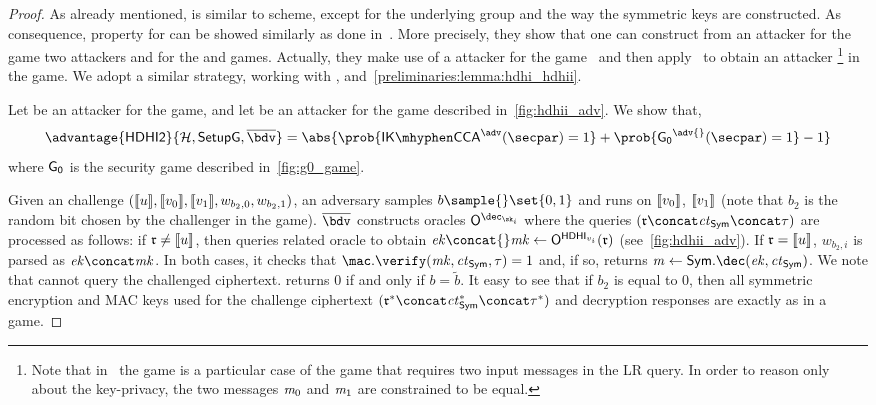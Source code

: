\begin{proof}
    As already mentioned, \dhaes{} is similar to \dhies{} scheme, except for the underlying group and the way the symmetric keys are constructed. As consequence, \ikcca{} property for \dhaes{} can be showed similarly as done in~\cite[Theorem 6.2]{abdalla2010robust}. More precisely, they show that one can construct from an attacker \adv{} for the \ikcca{} game two attackers \bdv{} and \cdv{} for the \odh{} and \sufcma{} games. Actually, they make use of a \bdvii{} attacker for the \odhii{} game~\cite[Figure 20]{abdalla2010robust} and then apply~\cite[Lemma 6.1]{abdalla2010robust} to obtain an attacker \bdv{}\footnote{Note that in~\cite{abdalla2010robust} the \ikcca{} game is a particular case of the \aicca{} game that requires two input messages in the LR query. In order to reason only about the key-privacy, the two messages $\mathit{m}_0$ and $\mathit{m}_1$ are constrained to be equal.} in the \odh{} game. We adopt a similar strategy, working with \hdhi{}, \hdhii{} and~\cref{preliminaries:lemma:hdhi_hdhii}.

    Let \adv{} be an attacker for the \ikcca{} game, and let \bdvii{} be an attacker for the \hdhii{} game described in~\cref{fig:hdhii_adv}. We show that,
    \[
        \advantage{\hdhii}{\hashSet, \groupSetup, \bdvii{}} = \abs{\prob{\ikcca^{\adv}(\secpar)=1} + \prob{\gamestyle{G_0}^{\adv{}} (\secpar)= 1}-1}
    \]
    where $\mathsf{G_0}$ is the security game described in~\cref{fig:g0_game}.

    Given an \hdhii{} challenge $(\llbracket {u} \rrbracket, \llbracket {v_{0}} \rrbracket, \llbracket {v_{1}} \rrbracket, w_{b_2, 0}, w_{b_2, 1})$, an adversary \bdvii{} samples $b \sample{} \set{0,1}$ and runs \adv{} on $\llbracket {v_{0}} \rrbracket$, $\llbracket {v_{1}} \rrbracket$ (note that $b_2$ is the random bit chosen by the \bdvii{} challenger in the \hdhii{} game). $\bdvii$ constructs oracles $\oracle{\dec_{\sk_i}}$ where the queries $(\gel{r} \concat \ct_{\sym} \concat \tau)$ are processed as follows: if $\mathfrak{r} \neq \llbracket {u} \rrbracket$, then \bdvii{} queries related \hdhii{} oracle to obtain $\ek{} \concat{} \mk\gets{} \oracleHdhi{v_i}(\gel{r})$ (see~\cref{fig:hdhii_adv}). If $\mathfrak{r}=\llbracket {u} \rrbracket$, $w_{b_2, i}$ is parsed as $\ek \concat \mk$. In both cases, it checks that $\mac.\verify(\mk, \ct_{\sym},\tau) = 1$ and, if so, returns $\msg \gets{} \sym.\dec(\ek,\ct_{\sym})$. We note that \adv{} cannot query the challenged ciphertext. \bdvii{} returns $0$ if and only if $b=\widetilde{b}$. It easy to see that if $b_2$ is equal to $0$, then all symmetric encryption and MAC keys used for the challenge ciphertext $(\gel{r}^{*} \concat \ct_{\sym}^{*} \concat \tau^{*})$ and decryption responses are exactly as in a \dhaes{} game.


\end{proof}
